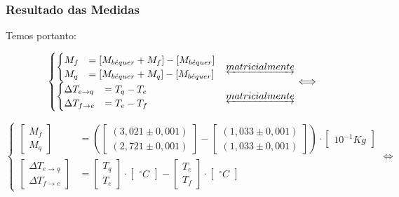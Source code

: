 \documentclass[a4paper]{article}
\begin{document}
		\subsubsection{Resultado das Medidas}

			Temos portanto:

			\[
			\begin{cases}
				\begin{cases}
					M_{f} & =\left[M_{b\acute{e}quer}+M_{f}\right]-\left[M_{b\acute{e}quer}\right]\\
					M_{q} & =\left[M_{b\acute{e}quer}+M_{q}\right]-\left[M_{b\acute{e}quer}\right]
				\end{cases} & \underleftrightarrow{matricialmente}\\
				\begin{cases}
					\Delta T_{e\rightarrow q} & =T_{q}-T_{e}\\
					\Delta T_{f\rightarrow e} & =T_{e}-T_{f}
				\end{cases} & \underleftrightarrow{matricialmente}
			\end{cases}\Longleftrightarrow
			\]


			\[
			\begin{cases}
			\left[\begin{array}{c}
				M_{f}\\
				M_{q}
			\end{array}\right] & =\left(\left[\begin{array}{c}
					\left(3,021\pm0,001\right)\\
					\left(2,721\pm0,001\right)
				\end{array}\right]-\left[\begin{array}{c}
					\left(1,033\pm0,001\right)\\
					\left(1,033\pm0,001\right)
			\end{array}\right]\right)\cdot\left[\begin{array}{c}
				10^{-1}\unit{Kg}\end{array}\right]\\
			\left[\begin{array}{c}
				\Delta T_{e\rightarrow q}\\
				\Delta T_{f\rightarrow e}
			\end{array}\right] & =\left[\begin{array}{c}
				T_{q}\\
				T_{e}
			\end{array}\right]\cdot\left[\begin{array}{c}
				\unit{^{\circ}C}\end{array}\right]-\left[\begin{array}{c}
				T_{e}\\
				T_{f}
			\end{array}\right]\cdot\left[\begin{array}{c}
				\unit{^{\circ}C}\end{array}\right]
			\end{cases}\Longleftrightarrow
			\]
\end{document}
